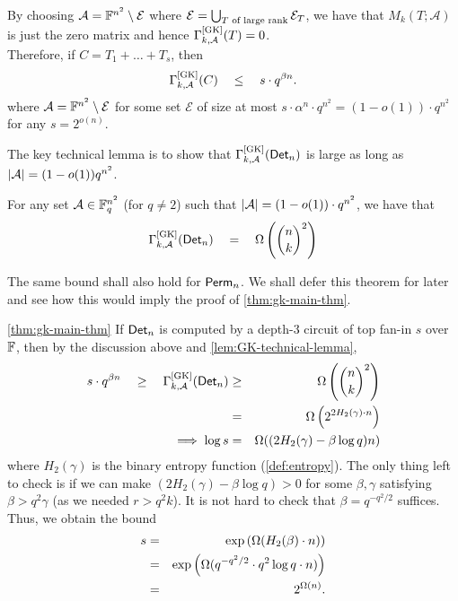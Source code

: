  By choosing $\mathcal{A} = \mathbb{F}^{n^2} \setminus \mathcal{E}$ where $\mathcal{E} = \bigcup_{\text{$T$ of large rank}} \mathcal{E}_T$, we have that $M_k(T;\mathcal{A})$ is just the zero matrix and hence
 $\Gamma^{\mathrm{[GK]}}_{k,\mathcal{A}}(T) = 0$.\\


Therefore, if $C = T_1 + \dots + T_s$, then 
\begin{equation}\label{eqn:gk-upper-bound-circuit}
\Gamma^{\mathrm{[GK]}}_{k,\mathcal{A}}(C) \quad \leq \quad s \cdot
q^{\beta n}.
\end{equation} 
where $\mathcal{A} = \mathbb{F}^{n^2} \setminus \mathcal{E}$ for some set $\mathcal{E}$ of size at most $s \cdot \alpha^n \cdot  q^{n^2} = (1 - o(1)) \cdot q^{n^2}$ for any $s = 2^{o(n)}$.

The key technical lemma is to show that $\Gamma^{\mathrm{[GK]}}_{k,\mathcal{A}}(\mathsf{Det}_n)$ is large as long as $\left|\mathcal{A}\right| = (1 - o(1)) q^{n^2}$. 

\begin{lemma}\label{lem:GK-technical-lemma}
For any set $\mathcal{A} \in \mathbb{F}_q^{n^2}$ (for $q\neq 2$) such that $\left|\mathcal{A}\right| =  (1 - o(1)) \cdot q^{n^2}$, we have that 
\[
\Gamma^{\mathrm{[GK]}}_{k,\mathcal{A}}(\mathsf{Det}_n) \quad = \quad \Omega\left(\binom{n}{k}^2\right)
\]
\end{lemma}

The same bound shall also hold for $\mathsf{Perm}_n$. We shall defer this theorem for later and see how this would imply the proof of \autoref{thm:gk-main-thm}. 

\begin{proofof}{\autoref{thm:gk-main-thm}}
If $\mathsf{Det}_n$ is computed by a depth-3 circuit of top fan-in $s$ over $\mathbb{F}$, then by the discussion above and \autoref{lem:GK-technical-lemma},
\begin{eqnarray*}
s \cdot q^{\beta n} \quad \geq \quad \Gamma^{\mathrm{[GK]}}_{k,\mathcal{A}}(\mathsf{Det}_n) & \geq &    \Omega\left(\binom{n}{k}^2\right)\\
 & = & \Omega\left(2^{2H_2(\gamma)\cdot n}\right)\\
\implies \log s & = & \Omega((2H_2(\gamma) - \beta \log q)n)
\end{eqnarray*}
where $H_2(\gamma)$ is the binary entropy function (\autoref{def:entropy}). The only thing left to check is if we can make $(2H_2(\gamma) - \beta \log q) > 0$ for some $\beta,\gamma$ satisfying $\beta > q^2 \gamma$ (as we needed $r > q^2 k$). It is not hard to check that $\beta = q^{-q^2/2}$ suffices. Thus, we obtain the bound
\begin{eqnarray*}
  s &=&  \exp\left(\Omega(H_2(\beta)\cdot n)\right) \\
    &=&  \exp\left(\Omega(q^{-q^2/2} \cdot q^2 \log q \cdot n)\right)\\
  & =& 2^{\Omega(n)}.
\end{eqnarray*}
\end{proofof}


